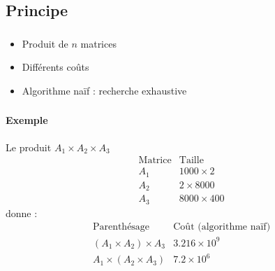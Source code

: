 \documentclass{beamer}
\begin{document}
\subsection{Principe}
\begin{frame}
  \frametitle{\insertsubsection}
  \begin{itemize}
  \item Produit de $n$ matrices
  \item Différents coûts
  \item Algorithme naïf : recherche exhaustive
  \end{itemize}





\end{frame}

\begin{frame}
  \frametitle{\insertsubsection}
  \framesubtitle{Exemple}
  Le produit $A_1 \times A_2 \times A_3$
  \[
  \begin{array}{cc} 
    \mbox{Matrice} & \mbox{Taille}\\
    A_1 & 1000 \times 2\\
    A_2 & 2 \times 8000\\
    A_3 & 8000 \times 400
  \end{array}
  \]
  donne :
  \[
  \begin{array}{cc}
    \mbox{Parenthésage} & \mbox{Coût (algorithme naïf)}\\
    (A_1 \times A_2) \times A_3 & 3.216 \times 10^9\\
    A_1 \times (A_2 \times A_3) & 7.2 \times 10^6
  \end{array}
  \]
\end{frame}
\end{document}

